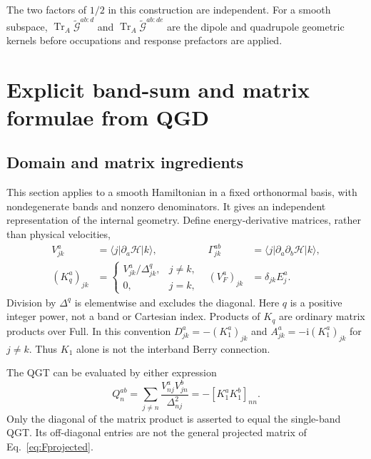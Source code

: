 \documentclass[prx,amsmath,amssymb,superscriptaddress,longbibliography]{revtex4-2}
\newcommand{\Tr}{\operatorname{Tr}}
\newcommand{\ii}{\mathrm{i}}
\begin{document}
The two factors of $1/2$ in this construction are independent.
For a smooth subspace, $\Tr_A\widetilde{\mathcal{G}}^{ab:d}$ and
$\Tr_A\widetilde{\mathcal{G}}^{ab:de}$ are the dipole and quadrupole
geometric kernels before occupations and response prefactors are applied.

\section{Explicit band-sum and matrix formulae from QGD}
\label{sec:qgd}

\subsection{Domain and matrix ingredients}
This section applies to a smooth Hamiltonian in a fixed orthonormal basis,
with nondegenerate bands and nonzero denominators.
It gives an independent representation of the internal geometry.
Define energy-derivative matrices, rather than physical velocities,
\begin{align}
 V_{jk}^a&=\langle j|\partial_a\mathcal H|k\rangle,
 &\Gamma_{jk}^{ab}&=\langle j|\partial_a\partial_b\mathcal H|k\rangle,
 \nonumber\\
 (K_q^a)_{jk}&=\begin{cases}V_{jk}^a/\Delta_{jk}^q,&j\ne k,\\0,&j=k,\end{cases}
 &(V_F^a)_{jk}&=\delta_{jk}E_j^a.
 \label{eq:qgd-ingredients}
\end{align}
Division by $\Delta^q$ is elementwise and excludes the diagonal.
Here $q$ is a positive integer power, not a band or Cartesian index.
Products of $K_q$ are ordinary matrix products over Full.
In this convention $D_{jk}^a=-(K_1^a)_{jk}$ and
$A_{jk}^a=-\ii(K_1^a)_{jk}$ for $j\ne k$.
Thus $K_1$ alone is not the interband Berry connection.

The QGT can be evaluated by either expression
\begin{equation}
 Q_n^{ab}=\sum_{j\ne n}\frac{V_{nj}^aV_{jn}^b}{\Delta_{nj}^2}
          =-[K_1^aK_1^b]_{nn}.
 \label{eq:qgt-matrix}
\end{equation}
Only the diagonal of the matrix product is asserted to equal the
single-band QGT. Its off-diagonal entries are not the general projected
matrix of Eq.~\eqref{eq:Fprojected}.
\end{document}
